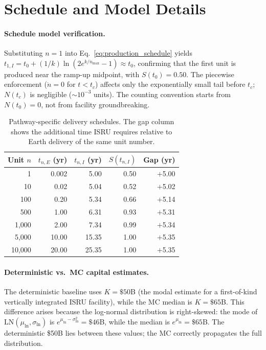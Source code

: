 \documentclass[preprint,12pt]{elsarticle}
\begin{document}
\section{Schedule and Model Details}
\label{sec:appendix_schedule}

\paragraph{Schedule model verification.} Substituting $n = 1$ into Eq.~\ref{eq:production_schedule} yields $t_{1,I} = t_0 + (1/k)\ln(2e^{k/\dot{n}_{\max}} - 1) \approx t_0$, confirming that the first unit is produced near the ramp-up midpoint, with $S(t_0) = 0.50$. The piecewise enforcement ($\dot{n} = 0$ for $t < t_c$) affects only the exponentially small tail before $t_c$; $N(t_c)$ is negligible (${\sim}10^{-3}$ units). The counting convention starts from $N(t_0) = 0$, not from facility groundbreaking.

\begin{table}[htbp]
\centering
\caption{Pathway-specific delivery schedules. The gap column shows the additional time ISRU requires relative to Earth delivery of the same unit number.}
\label{tab:production_schedule}
\small
\begin{tabular}{@{}rrrrr@{}}
\toprule
Unit $n$ & $t_{n,E}$ (yr) & $t_{n,I}$ (yr) & $S(t_{n,I})$ & Gap (yr) \\
\midrule
1      & 0.002 & 5.00  & 0.50 & $+$5.00 \\
10     & 0.02  & 5.04  & 0.52 & $+$5.02 \\
100    & 0.20  & 5.34  & 0.66 & $+$5.14 \\
500    & 1.00  & 6.31  & 0.93 & $+$5.31 \\
1{,}000  & 2.00  & 7.34  & 0.99 & $+$5.34 \\
5{,}000  & 10.00 & 15.35 & 1.00 & $+$5.35 \\
10{,}000 & 20.00 & 25.35 & 1.00 & $+$5.35 \\
\bottomrule
\end{tabular}
\end{table}

\paragraph{Deterministic vs.\ MC capital estimates.} The deterministic baseline uses $K = \$50$B (the modal estimate for a first-of-kind vertically integrated ISRU facility), while the MC median is $K = \$65$B. This difference arises because the log-normal distribution is right-skewed: the mode of $\mathrm{LN}(\mu_{\ln}, \sigma_{\ln})$ is $e^{\mu_{\ln} - \sigma_{\ln}^2} = \$46$B, while the median is $e^{\mu_{\ln}} = \$65$B. The deterministic \$50B lies between these values; the MC correctly propagates the full distribution.
\end{document}
